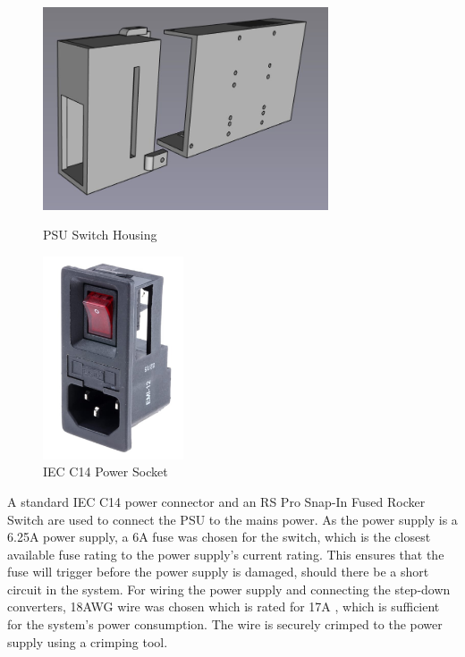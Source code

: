 \begin{figure}[H]
    \hfill
    \begin{minipage}[h]{0.45\textwidth}
        \centering
        \includegraphics[height=6cm]{imgs/freecad/psu_switch.jpg}
        \caption{PSU Switch Housing}
    \end{minipage}
    \hfill
    \begin{minipage}[h]{0.45\textwidth}
        \centering
        \includegraphics[height=6cm]{imgs/parts/iec_c14.jpg}
        \caption{IEC C14 Power Socket \cite{rsproc14switch}}
        \end{minipage}
    \hfill
\end{figure}

A standard IEC C14 power connector and an RS Pro Snap-In Fused Rocker Switch \cite{rsproc14switch} are used to connect the PSU to the mains power. As the power supply is a 6.25A power supply, a 6A fuse was chosen for the switch, which is the closest available fuse rating to the power supply's current rating. This ensures that the fuse will trigger before the power supply is damaged, should there be a short circuit in the system. For wiring the power supply and connecting the step-down converters, 18AWG wire was chosen which is rated for 17A \cite{18awgwire}, which is sufficient for the system's power consumption. The wire is securely crimped to the power supply using a crimping tool.

